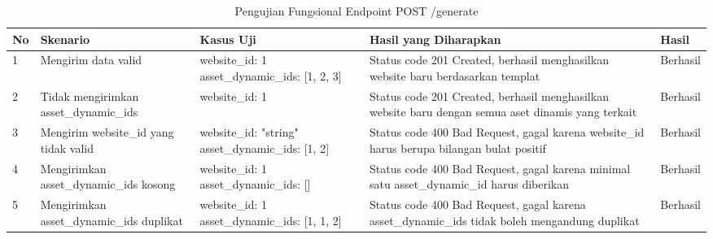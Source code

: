 \begin{table}[H]
    \centering
    \begin{tabular}{|p{0.5cm}|p{3cm}|p{5cm}|p{5cm}|p{1.5cm}|}
        \hline
        \rowcolor[HTML]{DAE8FC} 
        \textbf{No} & \textbf{Skenario} & \textbf{Kasus Uji} & \textbf{Hasil yang Diharapkan} & \textbf{Hasil} \\ \hline
        1 & Mengirim data valid & 
        website\_id: 1 \newline 
        asset\_dynamic\_ids: [1, 2, 3] & 
        Status code 201 Created, berhasil menghasilkan website baru berdasarkan templat & 
        Berhasil \\ \hline
        2 & Tidak mengirimkan asset\_dynamic\_ids & 
        website\_id: 1 & 
        Status code 201 Created, berhasil menghasilkan website baru dengan semua aset dinamis yang terkait & 
        Berhasil \\ \hline
        3 & Mengirim website\_id yang tidak valid & 
        website\_id: "string" \newline 
        asset\_dynamic\_ids: [1, 2] & 
        Status code 400 Bad Request, gagal karena website\_id harus berupa bilangan bulat positif & 
        Berhasil \\ \hline
        4 & Mengirimkan asset\_dynamic\_ids kosong & 
        website\_id: 1 \newline 
        asset\_dynamic\_ids: [] & 
        Status code 400 Bad Request, gagal karena minimal satu asset\_dynamic\_id harus diberikan & 
        Berhasil \\ \hline
        5 & Mengirimkan asset\_dynamic\_ids duplikat & 
        website\_id: 1 \newline 
        asset\_dynamic\_ids: [1, 1, 2] & 
        Status code 400 Bad Request, gagal karena asset\_dynamic\_ids tidak boleh mengandung duplikat & 
        Berhasil \\ \hline
    \end{tabular}
    \caption{Pengujian Fungsional Endpoint POST /generate}
    \label{tab:generate_post_testing}
\end{table}
